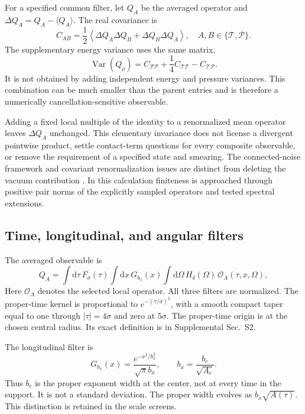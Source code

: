 \documentclass[aps,prd,reprint,floatfix,nofootinbib,longbibliography]{revtex4-2}
\newcommand{\dd}{\mathrm{d}}
\newcommand{\Tr}{\mathcal{T}}
\newcommand{\Pp}{\mathcal{P}}
\newcommand{\Var}{\operatorname{Var}}
\begin{document}
For a specified common filter, let $Q_A$ be the averaged operator and $\Delta Q_A=Q_A-\langle Q_A\rangle$. The real covariance is
\begin{equation}
 C_{AB}=\frac12\left\langle\Delta Q_A\Delta Q_B+\Delta Q_B\Delta Q_A\right\rangle,
 \quad A,B\in\{\Tr,\Pp\}.
 \label{eq:covariance}
\end{equation}
The supplementary energy variance uses the same matrix,
\begin{equation}
 \Var(Q_\rho)=C_{\Pp\Pp}+\frac14 C_{\Tr\Tr}-C_{\Tr\Pp}.
 \label{eq:rho}
\end{equation}
It is not obtained by adding independent energy and pressure variances. This combination can be much smaller than the parent entries and is therefore a numerically cancellation-sensitive observable.

Adding a fixed local multiple of the identity to a renormalized mean operator leaves $\Delta Q_A$ unchanged. This elementary invariance does not license a divergent pointwise product, settle contact-term questions for every composite observable, or remove the requirement of a specified state and smearing. The connected-noise framework and covariant renormalization issues are distinct from deleting the vacuum contribution \cite{PhillipsHu2001,DecaniniFolacci2008}. In this calculation finiteness is approached through positive pair norms of the explicitly sampled operators and tested spectral extensions.

\subsection{Time, longitudinal, and angular filters}
The averaged observable is
\begin{equation}
 Q_A=\int\dd\tau\,F_\sigma(\tau)
      \int\dd x\,G_{b_x}(x)
      \int\dd\Omega\,H_\delta(\Omega)\,\mathcal O_A(\tau,x,\Omega),
 \label{eq:smearing}
\end{equation}
Here $\mathcal O_A$ denotes the selected local operator. All three filters are normalized. The proper-time kernel is proportional to $e^{-(\tau/\sigma)^2}$, with a smooth compact taper equal to one through $|\tau|=4\sigma$ and zero at $5\sigma$. The proper-time origin is at the chosen central radius. Its exact definition is in Supplemental Sec.~S2.

The longitudinal filter is
\begin{equation}
 G_{b_x}(x)=\frac{e^{-x^2/b_x^2}}{\sqrt{\pi}b_x},\qquad
 b_x=\frac{b_c}{\sqrt{A_c}}.
 \label{eq:longitudinal}
\end{equation}
Thus $b_c$ is the proper exponent width at the center, not at every time in the support. It is not a standard deviation. The proper width evolves as $b_x\sqrt{A(\tau)}$. This distinction is retained in the scale screens.
\end{document}
